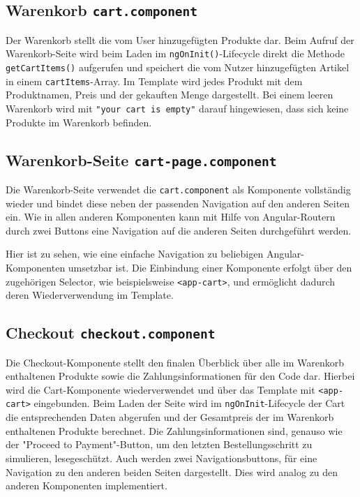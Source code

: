\documentclass[oneside]{ausarbeitung}
\begin{document}
\subsection{Warenkorb \texttt{cart.component}}

Der Warenkorb stellt die vom User hinzugefügten Produkte dar. Beim Aufruf der Warenkorb-Seite wird beim Laden im \texttt{ngOnInit()}-Lifecycle direkt die Methode \texttt{getCartItems()} aufgerufen und speichert die vom Nutzer hinzugefügten Artikel in einem \texttt{cartItems}-Array. Im Template wird jedes Produkt mit dem Produktnamen, Preis und der gekauften Menge dargestellt. Bei einem leeren Warenkorb wird mit \texttt{"your cart is empty"} darauf hingewiesen, dass sich keine Produkte im Warenkorb befinden.

\subsection{Warenkorb-Seite \texttt{cart-page.component}}

Die Warenkorb-Seite verwendet die \texttt{cart.component} als Komponente vollständig wieder und bindet diese neben der passenden Navigation auf den anderen Seiten ein. Wie in allen anderen Komponenten kann mit Hilfe von Angular-Routern durch zwei Buttons eine Navigation auf die anderen Seiten durchgeführt werden.


Hier ist zu sehen, wie eine einfache Navigation zu beliebigen Angular-Komponenten umsetzbar ist. Die Einbindung einer Komponente erfolgt über den zugehörigen Selector, wie beispielsweise \texttt{<app-cart>}, und ermöglicht dadurch deren Wiederverwendung im Template.

\subsection{Checkout \texttt{checkout.component}}

Die Checkout-Komponente stellt den finalen Überblick über alle im Warenkorb enthaltenen Produkte sowie die Zahlungsinformationen für den Code dar. Hierbei wird die Cart-Komponente wiederverwendet und über das Template mit \texttt{<app-cart>} eingebunden.
Beim Laden der Seite wird im \texttt{ngOnInit}-Lifecycle der Cart die entsprechenden Daten abgerufen und der Gesamtpreis der im Warenkorb enthaltenen Produkte berechnet. Die Zahlungsinformationen sind, genauso wie der "Proceed to Payment"-Button, um den letzten Bestellungsschritt zu simulieren, lesegeschützt. Auch werden zwei Navigationsbuttons, für eine Navigation zu den anderen beiden Seiten dargestellt. Dies wird analog zu den anderen Komponenten implementiert.
\end{document}
